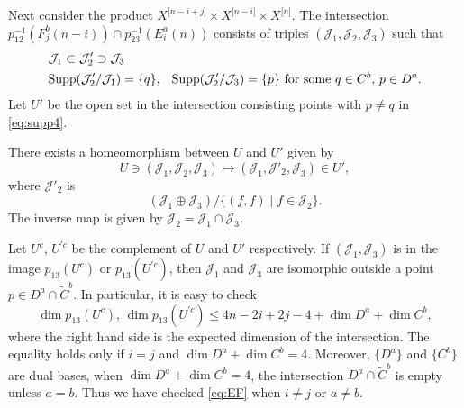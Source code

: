 \documentclass[12pt]{amsart}
\newcommand{\cal}{\mathcal}
\theoremstyle{definition}
\theoremstyle{remark}
\numberwithin{equation}{section}
\newcommand{\Hilb}[2]{{#1}^{\lbrack{#2}\rbrack}} %
\newcommand{\HilbX}[1]{\Hilb{X}{#1}}
\newcommand{\idl}{\cal J} %
\newcommand{\Supp}{\operatorname{Supp}} %
\begin{document}
Next consider the product $\HilbX{n-i+j}\times\HilbX{n-i}\times\HilbX{n}$.
The intersection $p_{12}^{-1}(F_j^b(n-i))\cap p_{23}^{-1}(E_i^a(n))$
consists of triples $(\idl_1, \idl_2, \idl_3)$ such that
\begin{align}
  & \idl_1\subset\idl'_2\supset\idl_3 \label{eq:incl4}\\
  & \text{$\Supp(\idl'_2/\idl_1) = \{q\}$, \;
    $\Supp(\idl'_2/\idl_3) = \{p\}$ for some $q\in C^b$, $p\in D^a$.}
 \label{eq:supp4}
\end{align}
Let $U'$ be the open set in the intersection consisting points
with $p\ne q$ in \eqref{eq:supp4}.

There exists a homeomorphism between $U$ and $U'$ given by
\begin{equation*}
  U\ni (\idl_1, \idl_2, \idl_3) \mapsto (\idl_1, \idl'_2, \idl_3) \in U',
\end{equation*}
where $\idl'_2$ is
\begin{equation*}
  (\idl_1 \oplus \idl_3)/ \{ (f, f)\mid f\in \idl_2\} .
\end{equation*}
The inverse map is given by $\idl_2 = \idl_1 \cap \idl_3$.

Let $U^c$, $U^{\prime c}$ be the complement of $U$ and $U'$ respectively.
If $(\idl_1, \idl_3)$ is in the image $p_{13}(U^c)$ or
$p_{13}(U^{\prime c})$,
then $\idl_1$ and $\idl_3$ are isomorphic outside a point
$p\in D^a\cap \widetilde C^b$.
In particular, it is easy to check
\begin{equation*}
  \dim p_{13}(U^c), \, \dim p_{13}(U^{\prime c}) \le
  4n - 2i + 2j - 4 + \dim D^a + \dim C^b,
\end{equation*}
where the right hand side is the expected dimension of the intersection.
The equality holds only if $i = j$ and $\dim D^a + \dim C^b = 4$.
Moreover, $\{D^a\}$ and $\{C^b\}$ are dual bases,
when $\dim D^a + \dim C^b = 4$,
the intersection
$D^a\cap \widetilde C^b$ is empty unless $a = b$.
Thus we have checked \eqref{eq:EF} when $i\ne j$ or $a\ne b$.
\end{document}
